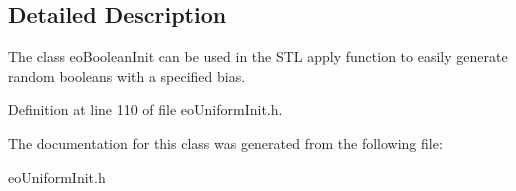 \subsection{Detailed Description}
The class eo\-Boolean\-Init can be used in the STL apply function to easily generate random booleans with a specified bias. 



Definition at line 110 of file eo\-Uniform\-Init.h.

The documentation for this class was generated from the following file:\begin{CompactItemize}
\item 
eo\-Uniform\-Init.h\end{CompactItemize}
